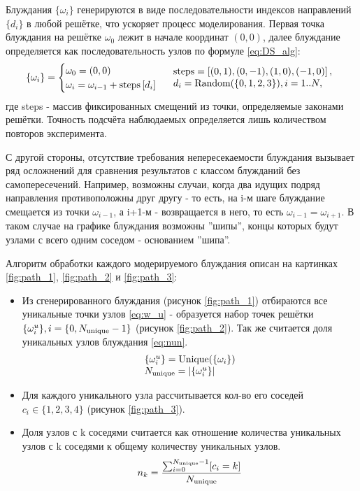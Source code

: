 Блуждания $\{ \omega_ i \}$ генерируются в виде последовательности индексов направлений $ \{d_{i}\} $ в любой решётке, что ускоряет процесс моделирования. 
Первая точка блуждания на решётке $\omega_{0}$ лежит в начале координат $(0,0)$, далее блуждание определяется как последовательность узлов по формуле \eqref{eq:DS_alg}:
\begin{equation}
\{ \omega_i \} = 
\begin{cases}
\omega_{0} = (0,0) \\
\omega_{i} = \omega_{i-1} +\textup{steps}\left[d_{i}\right] 
\end{cases}
\begin{array}{l}
\textup{steps} = \left[(0,1), (0,-1), (1,0), (-1,0)\right], \\
d_i = \textup{Random}(\{0,1,2,3\}), i = 1..N,
\end{array}
\label{eq:DS_alg}
\end{equation}
где steps - массив фиксированных смещений из точки, определяемые законами решётки. 
Точность подсчёта наблюдаемых определяется лишь количеством повторов эксперимента.

С другой стороны, отсутствие требования непересекаемости блуждания вызывает ряд осложнений для сравнения результатов с классом блужданий без самопересечений. 
Например, возможны случаи, когда два идущих подряд направления противоположны друг другу - то есть, на i-м шаге блуждание смещается из точки $\omega_{i-1}$, а i+1-м - возвращается в него, то есть $\omega_{i-1} = \omega_{i+1}$.
В таком случае на графике блуждания возможны ''шипы'', концы которых будут узлами с всего одним соседом - основанием ''шипа''. 



Алгоритм обработки каждого модерируемого блуждания описан на картинках \ref{fig:path_1}, \ref{fig:path_2} и \ref{fig:path_3}:
\begin{itemize}
    \item Из сгенерированного блуждания (рисунок \ref{fig:path_1}) отбираются все уникальные точки узлов \eqref{eq:w_u} - образуется набор точек решётки $\{\omega^u_i\}, i = \{0, N_{\textup{unique}}-1\}$ (рисунок \ref{fig:path_2}). Так же считается доля уникальных узлов блуждания \eqref{eq:nun}.
	\begin{equation}
	\begin{array}{l}
	\{ \omega^u_i \} = \textup{Unique}( \{ \omega_i \} ) \\
	N_{\textup{unique}} = |\{ \omega^u_i \}|
	\end{array}
	\label{eq:w_u}
	\end{equation}
    \item Для каждого уникального узла рассчитывается кол-во его соседей $c_i \in \{1,2,3,4\}$  (рисунок \ref{fig:path_3}).
    \item Доля узлов с k соседями считается как отношение количества уникальных узлов с k соседями к общему количеству уникальных узлов.
	\begin{equation}
	n_k = \frac{\sum_{i=0}^{N_{\textup{unique}}-1}[c_i = k]}{N_{\textup{unique}}}
	\label{eq:n_i}
	\end{equation}
\end{itemize}

